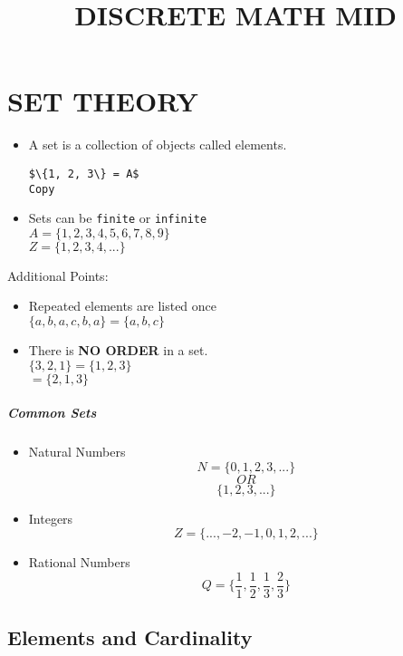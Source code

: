 \documentclass[
]{article}
\title{DISCRETE MATH MID}
\author{}
\date{}
\providecommand{\tightlist}{%
  \setlength{\itemsep}{0pt}\setlength{\parskip}{0pt}}
\begin{document}
\maketitle

\hypertarget{set-theory}{%
\section{SET THEORY}\label{set-theory}}

\begin{itemize}
\item
  A set is a collection of objects called elements.

\begin{verbatim}
$\{1, 2, 3\} = A$
Copy
\end{verbatim}
\item
  Sets can be \texttt{finite} or \texttt{infinite}\\
  {\(A = \{ 1,2,3,4,5,6,7,8,9\}\)}\\
  {\(Z = \{ 1,2,3,4,...\}\)}
\end{itemize}

Additional Points:

\begin{itemize}
\tightlist
\item
  Repeated elements are listed once\\
  {\(\{ a,b,a,c,b,a\} = \{ a,b,c\}\)}
\item
  {There is \textbf{NO ORDER} in a set.}\\
  {\(\{ 3,2,1\} = \{ 1,2,3\}\)}\\
  {\(= \{ 2,1,3\}\)}
\end{itemize}

\hypertarget{common-sets}{%
\subparagraph{Common Sets}\label{common-sets}}

\begin{itemize}
\tightlist
\item
  Natural Numbers\\
  {\[N = \{ 0,1,2,3,...\}\]} {\[OR\]} {\[\{ 1,2,3,...\}\]}
\item
  Integers\\
  {\[Z = \{..., - 2, - 1,0,1,2,...\}\]}
\item
  Rational Numbers\\
  {\[Q = \{\frac{1}{1},\frac{1}{2},\frac{1}{3},\frac{2}{3}\}\]}
\end{itemize}

\hypertarget{elements-and-cardinality}{%
\subsection{Elements and Cardinality}\label{elements-and-cardinality}}
\end{document}
